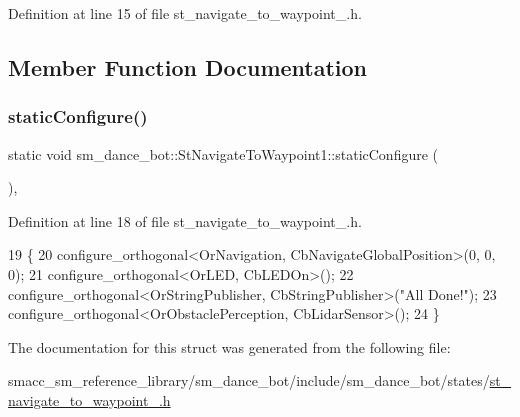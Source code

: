 Definition at line 15 of file st\+\_\+navigate\+\_\+to\+\_\+waypoint\+\_.\+h.



\subsection{Member Function Documentation}
\mbox{\label{structsm__dance__bot_1_1StNavigateToWaypoint1_ae64899be8775f9ac0aaaead84c5cba5f}} 
\subsubsection{\texorpdfstring{static\+Configure()}{staticConfigure()}}
{\footnotesize\ttfamily static void sm\+\_\+dance\+\_\+bot\+::\+St\+Navigate\+To\+Waypoint1\+::static\+Configure (\begin{DoxyParamCaption}{ }\end{DoxyParamCaption})\hspace{0.3cm}{\ttfamily [inline]}, {\ttfamily [static]}}



Definition at line 18 of file st\+\_\+navigate\+\_\+to\+\_\+waypoint\+\_.\+h.


\begin{DoxyCode}
19   \{
20     configure\_orthogonal<OrNavigation, CbNavigateGlobalPosition>(0, 0, 0);
21     configure\_orthogonal<OrLED, CbLEDOn>();
22     configure\_orthogonal<OrStringPublisher, CbStringPublisher>(\textcolor{stringliteral}{"All Done!"});
23     configure\_orthogonal<OrObstaclePerception, CbLidarSensor>();
24   \}
\end{DoxyCode}


The documentation for this struct was generated from the following file\+:\begin{DoxyCompactItemize}
\item 
smacc\+\_\+sm\+\_\+reference\+\_\+library/sm\+\_\+dance\+\_\+bot/include/sm\+\_\+dance\+\_\+bot/states/\hyperlink{sm__dance__bot_2include_2sm__dance__bot_2states_2st__navigate__to__waypoint__1_8h}{st\+\_\+navigate\+\_\+to\+\_\+waypoint\+\_.\+h}\end{DoxyCompactItemize}
